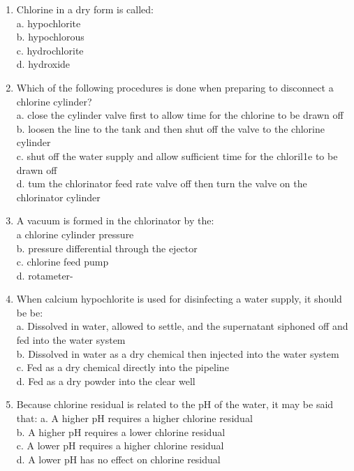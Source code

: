 \begin{enumerate}
\item Chlorine in a dry form is called:\\
a.	hypochlorite\\
b.	hypochlorous\\
c.	hydrochlorite\\
d.	hydroxide\\

\item Which of the following procedures is done when preparing to disconnect a chlorine cylinder?\\
a.	close the cylinder valve first to allow time for the chlorine to be drawn off\\
b.	loosen the line to the tank and then shut off the valve to the chlorine cylinder\\
c.	shut off the water supply and allow sufficient time for the chloril1e to be drawn off\\
d.	tum the chlorinator feed rate valve off then turn the valve on the chlorinator cylinder\\


\item A vacuum is formed in the chlorinator by the:\\
a	chlorine cylinder pressure\\
b.	pressure differential through the ejector\\
c.	chlorine feed pump\\
d.	rotameter-\\

\item When calcium hypochlorite is used for disinfecting a water supply, it should be be:\\
a. Dissolved in water, allowed to settle, and the supernatant siphoned off and fed into the water system\\
b. Dissolved in water as a dry chemical then injected into the water system\\
c. Fed as a dry chemical directly into the pipeline\\
d. Fed as a dry powder into the clear well\\

\item Because chlorine residual is related to the pH of the water, it may be said that:
a. A higher pH requires a higher chlorine residual\\
b. A higher pH requires a lower chlorine residual\\
c. A lower pH requires a higher chlorine residual\\
d. A lower pH has no effect on chlorine residual\\


\end{enumerate}
